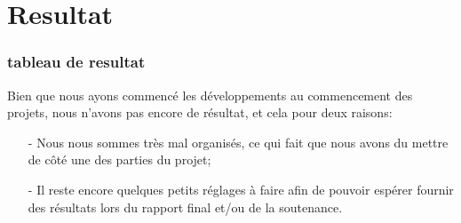  \part{Resultat} %
 \label{prt:resultat_}
 
	\section{tableau de resultat} %
		\label{sec:tableau_de_resultat}
		
		Bien que nous ayons commencé les développements au commencement des projets, nous n'avons pas encore de résultat, et cela pour deux raisons:
		\begin{itemize}
			\item[-] Nous nous sommes très mal organisés, ce qui fait que nous avons du mettre de côté une des parties du projet;
			\item[-] Il reste encore quelques petits réglages à faire afin de pouvoir espérer fournir des résultats lors du rapport final et/ou de la soutenance.
		\end{itemize}


